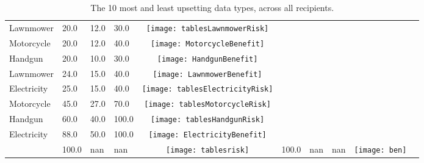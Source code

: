 \begin{table}[t]
\begin{center}
\begin{tabular}{| p{2cm} | p{1cm} | p{1cm} | p{1cm} | c | p{2cm} | p{1cm} | p{1cm} | p{1cm} | c |}
Lawnmower & 20.0 & 12.0 & 30.0 & \texttt{[image: tablesLawnmowerRisk]} \\ 
Motorcycle & 20.0 & 12.0 & 40.0 & \texttt{[image: MotorcycleBenefit]} \\ 
Handgun & 20.0 & 10.0 & 30.0 & \texttt{[image: HandgunBenefit]} \\ 
Lawnmower & 24.0 & 15.0 & 40.0 & \texttt{[image: LawnmowerBenefit]} \\ 
Electricity & 25.0 & 15.0 & 40.0 & \texttt{[image: tablesElectricityRisk]} \\ 
Motorcycle & 45.0 & 27.0 & 70.0 & \texttt{[image: tablesMotorcycleRisk]} \\ 
Handgun & 60.0 & 40.0 & 100.0 & \texttt{[image: tablesHandgunRisk]} \\ 
Electricity & 88.0 & 50.0 & 100.0 & \texttt{[image: ElectricityBenefit]} \\ 
 & 100.0 & nan & nan & \texttt{[image: tablesrisk]} & 100.0 & nan & nan & \texttt{[image: ben]} \\ 
\hline
\end{tabular}
\caption{The 10 most and least upsetting data types, across all recipients.}
\label{top10}
\end{center}
\end{table}
